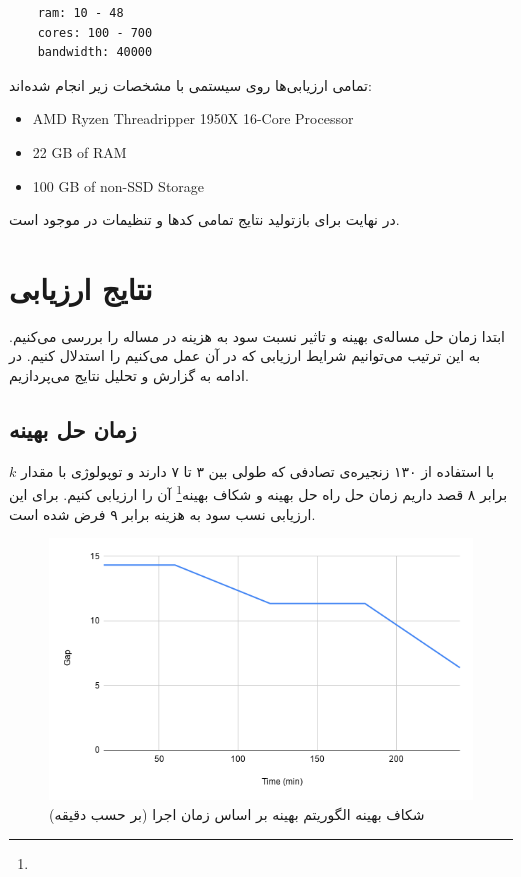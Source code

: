 \begin{latin}
    \begin{verbatim}
    ram: 10 - 48
    cores: 100 - 700
    bandwidth: 40000
    \end{verbatim}
\end{latin}

تمامی ارزیابی‌ها روی سیستمی با مشخصات زیر انجام شده‌اند:

\begin{latin}
    \begin{itemize}
        \item AMD Ryzen Threadripper 1950X 16-Core Processor
        \item 22 GB of RAM
        \item 100 GB of non-SSD Storage
    \end{itemize}
\end{latin}

در نهایت برای بازتولید نتایج تمامی کدها و تنظیمات در \cite{RoadToMSc} موجود است.

\section{نتایج ارزیابی}
ابتدا زمان حل مساله‌ی بهینه و تاثیر نسبت سود به هزینه در مساله را بررسی می‌کنیم.
به این ترتیب می‌توانیم شرایط ارزیابی که در آن عمل می‌کنیم را استدلال کنیم.
در ادامه به گزارش و تحلیل نتایج می‌پردازیم.

\subsection{زمان حل بهینه}
با استفاده از ۱۳۰ زنجیره‌ی تصادفی که طولی بین ۳ تا ۷ دارند
و توپولوژی  با مقدار \(k\) برابر ۸ قصد داریم
زمان حل راه حل بهینه و شکاف بهینه\footnote{} آن را ارزیابی کنیم. برای این ارزیابی نسب سود به هزینه برابر ۹ فرض شده است.


\begin{figure}[h]
\center\includegraphics[scale=.7]{images/chart-5}
\caption{شکاف بهینه الگوریتم بهینه بر اساس زمان اجرا (بر حسب دقیقه)}
\label{fig.10}
\end{figure}

